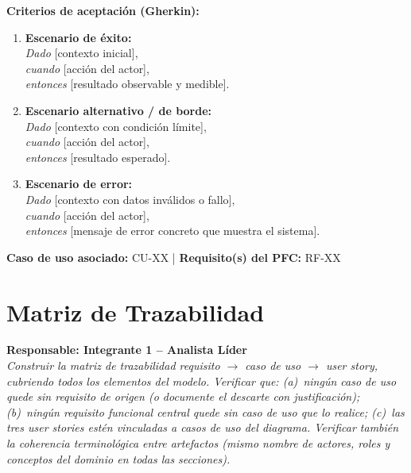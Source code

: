 \documentclass[journal,onecolumn]{IEEEtran}
\newcommand{\guia}[2]{%
  \begin{mdframed}[style=guia]
    \noindent\textbf{Responsable: #1}\\[2pt]
    \textit{#2}
  \end{mdframed}
}
\begin{document}
\textbf{Criterios de aceptación (Gherkin):}

\begin{enumerate}[leftmargin=*]
  \item \textbf{Escenario de éxito:}\\
        \textit{Dado} [contexto inicial],\\
        \textit{cuando} [acción del actor],\\
        \textit{entonces} [resultado observable y medible].

  \item \textbf{Escenario alternativo / de borde:}\\
        \textit{Dado} [contexto con condición límite],\\
        \textit{cuando} [acción del actor],\\
        \textit{entonces} [resultado esperado].

  \item \textbf{Escenario de error:}\\
        \textit{Dado} [contexto con datos inválidos o fallo],\\
        \textit{cuando} [acción del actor],\\
        \textit{entonces} [mensaje de error concreto que muestra el sistema].
\end{enumerate}

\textbf{Caso de uso asociado:} CU-XX | \textbf{Requisito(s) del PFC:} RF-XX

\newpage

\section{Matriz de Trazabilidad}

\guia{Integrante 1 -- Analista Líder}{%
Construir la matriz de trazabilidad requisito $\rightarrow$ caso de uso
$\rightarrow$ user story, cubriendo todos los elementos del modelo.
Verificar que: (a)~ningún caso de uso quede sin requisito de origen
(o documente el descarte con justificación); (b)~ningún requisito funcional
central quede sin caso de uso que lo realice; (c)~las tres user stories
estén vinculadas a casos de uso del diagrama.
Verificar también la coherencia terminológica entre artefactos (mismo nombre
de actores, roles y conceptos del dominio en todas las secciones).}
\end{document}

